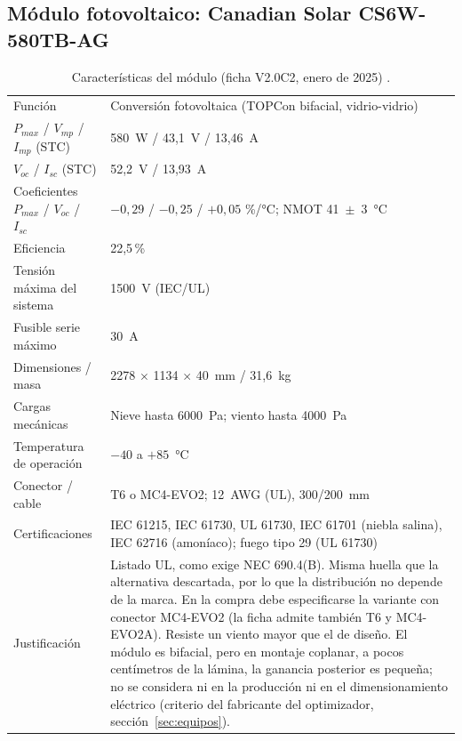 \documentclass[12pt]{article}
\begin{document}
\subsection{Módulo fotovoltaico: Canadian Solar CS6W-580TB-AG}
\begin{table}[H]
\centering\small
\caption{Características del módulo (ficha V2.0C2, enero de 2025) \cite{csDatasheet}.}\label{tab:modulo}
\begin{tabularx}{\textwidth}{L{5.4cm}Y}
\toprule
Función & Conversión fotovoltaica (TOPCon bifacial, vidrio-vidrio)\\
$P_{max}$ / $V_{mp}$ / $I_{mp}$ (STC) & 580~W / 43,1~V / 13,46~A\\
$V_{oc}$ / $I_{sc}$ (STC) & 52,2~V / 13,93~A\\
Coeficientes $P_{max}$ / $V_{oc}$ / $I_{sc}$ & $-0{,}29$ / $-0{,}25$ / $+0{,}05$ \%/°C; NMOT 41~$\pm$~3~°C\\
Eficiencia & 22,5\,\%\\
Tensión máxima del sistema & 1500~V (IEC/UL)\\
Fusible serie máximo & 30~A\\
Dimensiones / masa & 2278 $\times$ 1134 $\times$ 40~mm / 31,6~kg\\
Cargas mecánicas & Nieve hasta 6000~Pa; viento hasta 4000~Pa\\
Temperatura de operación & $-40$ a $+85$~°C\\
Conector / cable & T6 o MC4-EVO2; 12~AWG (UL), 300/200~mm\\
Certificaciones & IEC 61215, IEC 61730, UL 61730, IEC 61701 (niebla salina), IEC 62716 (amoníaco); fuego tipo 29 (UL 61730)\\
Justificación & Listado UL, como exige NEC 690.4(B). Misma huella que la alternativa descartada, por lo que la distribución no depende de la marca. En la compra debe especificarse la variante con conector MC4-EVO2 (la ficha admite también T6 y MC4-EVO2A). Resiste un viento mayor que el de diseño. El módulo es bifacial, pero en montaje coplanar, a pocos centímetros de la lámina, la ganancia posterior es pequeña; no se considera ni en la producción ni en el dimensionamiento eléctrico (criterio del fabricante del optimizador, sección~\ref{sec:equipos}).\\
\bottomrule
\end{tabularx}
\end{table}
\end{document}

